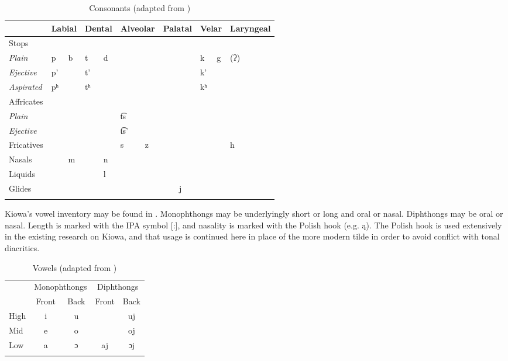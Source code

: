 \documentclass[output=paper]{langscibook}
\begin{document}
\begin{table}
\begin{tabular}{lllllllllllll}
        \lsptoprule
         & \multicolumn{2}{l}{Labial} & \multicolumn{2}{l}{Dental} & \multicolumn{2}{l}{Alveolar} & \multicolumn{2}{l}{Palatal} & \multicolumn{2}{l}{Velar} & \multicolumn{2}{l}{Laryngeal} \\
         \midrule
         Stops &&&&&&&&&&& \\
         \hspace{.5cm} \textit{Plain} & p & b & t & d & & & &  & k & g & (ʔ)\\
         \hspace{.5cm} \textit{Ejective} & p' & & t' & & & & & & k' & & \\
         \hspace{.5cm} \textit{Aspirated} & pʰ & & tʰ & & & & & & kʰ & &  \\
         Affricates &&&&&&&&&&& \\
         \hspace{.5cm} \textit{Plain} &&&&& t͡s &&&&&& \\
         \hspace{.5cm} \textit{Ejective} &&&&& {t͡s'} &&&&&& \\
         Fricatives &&&&& s & z &&& & & h \\
         Nasals & & m & & n &&&&&&& \\
         Liquids &&&& l &&&&&&& \\
         Glides &&&&&&&& j &&& \\
         \lspbottomrule
    \end{tabular}
    \caption{Consonants (adapted from \citealt{Watkins:1984})}
    \label{tab:consonants}
\end{table}

Kiowa's vowel inventory may be found in . Monophthongs may be underlyingly short or long and oral or nasal. Diphthongs may be oral or nasal. Length is marked with the IPA symbol [:], and nasality is marked with the Polish hook (e.g. \k{a}). The Polish hook is used extensively in the existing research on Kiowa, and that usage is continued here in place of the more modern tilde in order to avoid conflict with tonal diacritics.

\begin{table}
    \begin{tabular}{l cccc}
        \lsptoprule
         &\multicolumn{2}{c}{Monophthongs} &  \multicolumn{2}{c}{Diphthongs}\\
         \cmidrule(r){2-3}\cmidrule(l){4-5}
         & Front & Back &  Front & Back \\
         \midrule
         High & i & u &    & uj \\
         Mid  & e & o &    & oj \\
         Low  & a & ɔ & aj & ɔj \\
         \lspbottomrule
    \end{tabular}
    \caption{Vowels (adapted from \citealt{Watkins:1984})}
    \label{tab:vowels}
\end{table}
\end{document}

